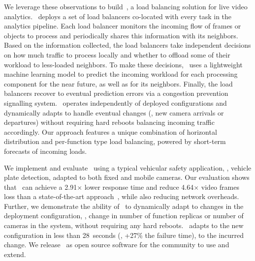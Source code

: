 We leverage these observations to build~\videojam{}, a load balancing solution for live video analytics.~\videojam{} deploys a set of load balancers co-located with every task in the analytics pipeline. Each load balancer monitors the incoming flow of frames or objects to process and periodically shares this information with its neighbors. Based on the information collected, the load balancers take independent decisions on how much traffic to process locally and whether to offload some of their workload to less-loaded neighbors. To make these decisions,~\videojam{} uses a lightweight machine learning model to predict the incoming workload for each processing component for the near future, as well as for its neighbors. Finally, the load balancers recover to eventual prediction errors via a congestion prevention signalling system.~\videojam{} operates independently of deployed configurations and dynamically adapts to handle eventual changes (\eg, new camera arrivals or departures) without requiring hard reboots balancing incoming traffic accordingly. Our approach features a unique combination of horizontal distribution and per-function type load balancing, powered by short-term forecasts of incoming loads.

We implement and evaluate~\videojam{} using a typical vehicular safety application, \ie, vehicle plate detection, adapted to both fixed and mobile cameras. Our evaluation shows that~\videojam{} can achieve a 2.91$\times$ lower response time and reduce 4.64$\times$ video frames loss than a state-of-the-art approach~\cite{zeng2020distream}, while also reducing network overheads. Further, we demonstrate the ability of~\videojam{} to dynamically adapt to changes in the deployment configuration, \ie, change in number of function replicas or number of cameras in the system, without requiring any hard reboots.~\videojam{} adapts to the new configuration in less than 28~seconds (\ie, +27\% the failure time), to the incurred change. We release~\videojam{} as open source software for the community to use and extend.
